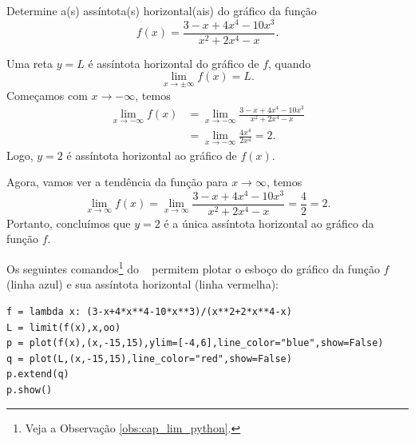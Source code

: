 \begin{exeresol}
  Determine a(s) assíntota(s) horizontal(ais) do gráfico da função
  \begin{equation}
    f(x) = \frac{3 - x + 4x^4 - 10x^3}{x^2 + 2x^4 -x}.
  \end{equation}
\end{exeresol}
\begin{resol}
  Uma reta $y = L$ é assíntota horizontal do gráfico de $f$, quando
  \begin{equation}
    \lim_{x\to\pm\infty} f(x) = L.
  \end{equation}
  Começamos com $x\to-\infty$, temos
  \begin{align}
    \lim_{x\to-\infty} f(x) &= \lim_{x\to-\infty} \frac{3 - x + 4x^4 - 10x^3}{x^2 + 2x^4 -x} \\
                            &= \lim_{x\to -\infty} \frac{4x^4}{2x^4} = 2.
  \end{align}
  Logo, $y=2$ é assíntota horizontal ao gráfico de $f(x)$.

  Agora, vamos ver a tendência da função para $x\to\infty$, temos
  \begin{equation}
    \lim_{x\to\infty} f(x) = \lim_{x\to\infty} \frac{3 - x + 4x^4 - 10x^3}{x^2 + 2x^4 -x} = \frac{4}{2} = 2.
  \end{equation}
  Portanto, concluímos que $y=2$ é a única assíntota horizontal ao gráfico da função $f$.

  \ifispython
  Os seguintes comandos\footnote{Veja a Observação \ref{obs:cap_lim_python}.} do \sympy~  permitem plotar o esboço do gráfico da função $f$ (linha azul) e sua assíntota horizontal (linha vermelha):
\begin{verbatim}
f = lambda x: (3-x+4*x**4-10*x**3)/(x**2+2*x**4-x)
L = limit(f(x),x,oo)
p = plot(f(x),(x,-15,15),ylim=[-4,6],line_color="blue",show=False)
q = plot(L,(x,-15,15),line_color="red",show=False)
p.extend(q)
p.show()
\end{verbatim}
  \fi
\end{resol}

